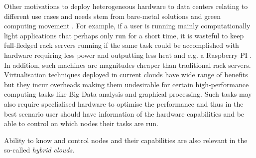 Other motivations to deploy heterogeneous hardware to data centers relating to different use cases and needs stem from bare-metal solutions and green computing movement \cite{Kurp2008}. For example, if a user is running mainly computationally light applications that perhaps only run for a short time, it is wasteful to keep full-fledged rack servers running if the same task could be accomplished with hardware requiring less power and outputting less heat and e.g. a Raspberry PI \cite{raspberry}. In addition, such machines are magnitudes cheaper than traditional rack servers. Virtualisation techniques deployed in current clouds have wide range of benefits but they incur overheads making them undesirable for certain high-performance computing tasks like Big Data analysis and graphical processing. Such tasks may also require speclialised hardware to optimise the performance and thus in the best scenario user should have information of the hardware capabilities and be able to control on which nodes their tasks are run.

Ability to know and control nodes and their capabilities are also relevant in the so-called \textit{hybrid clouds}.


	
